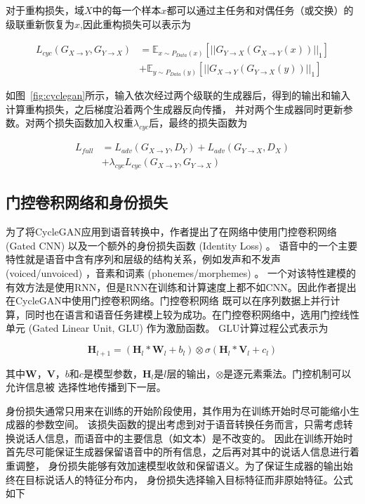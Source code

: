 对于重构损失，域$X$中的每一个样本$x$都可以通过主任务和对偶任务（或交换）的级联重新恢复为$x$,因此重构损失可以表示为

\begin{align}
    L_{cyc}(G_{X\rightarrow Y},G_{Y\rightarrow X}) & = \mathbb{E}_{x\sim P_{Data}(x)}\left[\left| \left| G_{Y\rightarrow X}(G_{X\rightarrow Y}(x))\right| \right|_1 \right] \\
    & + \mathbb{E}_{y\sim P_{Data}(y)}\left[\left| \left| G_{X\rightarrow Y}(G_{Y\rightarrow X}(y))\right| \right|_1 \right]
\end{align}

如图~\ref{fig:cyclegan}所示，输入依次经过两个级联的生成器后，得到的输出和输入计算重构损失，之后梯度沿着两个生成器反向传播，
并对两个生成器同时更新参数。对两个损失函数加入权重$\lambda_{cyc}$后，最终的损失函数为

\begin{align}
    L_{full}& =L_{adv}(G_{X\rightarrow Y},D_Y)+L_{adv}(G_{Y\rightarrow X},D_X)\\
    & +\lambda_{cyc}L_{cyc}(G_{X\rightarrow Y},G_{Y\rightarrow X})
\end{align}

\subsection{门控卷积网络和身份损失}
为了将CycleGAN应用到语音转换中，作者提出了在网络中使用门控卷积网络 (Gated CNN) 以及一个额外的身份损失函数 (Identity Loss) 。
语音中的一个主要特性就是语音中含有序列和层级的结构关系，例如发声和不发声 (voiced/unvoiced) ，音素和词素 (phonemes/morphemes) 。
一个对该特性建模的有效方法是使用RNN，但是RNN在训练和计算速度上都不如CNN。因此作者提出在CycleGAN中使用门控卷积网络。门控卷积网络
既可以在序列数据上并行计算，同时也在语言和语音任务建模上较为成功。在门控卷积网络中，选用门控线性单元 (Gated Linear Unit, GLU) 作为激励函数。
GLU计算过程公式表示为

\begin{equation}
    \mathbf{H}_{l+1}=(\mathbf{H}_l \ast \mathbf{W}_l + b_l)\otimes \sigma (\mathbf{H}_l \ast \mathbf{V}_l + c_l)
\end{equation}

其中$\mathbf{W}$，$\mathbf{V}$，$b$和$c$是模型参数，$\mathbf{H}_l$是$l$层的输出，$\otimes$是逐元素乘法。门控机制可以允许信息被
选择性地传播到下一层。

身份损失通常只用来在训练的开始阶段使用，其作用为在训练开始时尽可能缩小生成器的参数空间。
该损失函数的提出考虑到对于语音转换任务而言，只需考虑转换说话人信息，而语音中的主要信息（如文本）是不改变的。
因此在训练开始时首先尽可能保证生成器保留语音中的所有信息，之后再对其中的说话人信息进行着重调整，
身份损失能够有效加速模型收敛和保留语义。为了保证生成器的输出始终在目标说话人的特征分布内，
身份损失选择输入目标特征而非原始特征。公式如下

